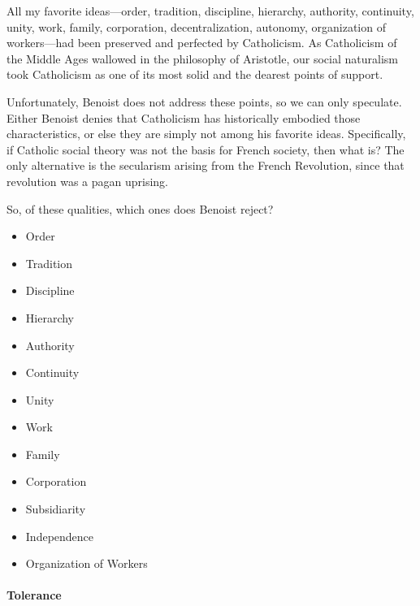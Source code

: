 \begin{quotex}
All my favorite ideas---order, tradition, discipline, hierarchy, authority, continuity, unity, work, family, corporation, decentralization, autonomy, organization of workers---had been preserved and perfected by Catholicism. As Catholicism of the Middle Ages wallowed in the philosophy of Aristotle, our social naturalism took Catholicism as one of its most solid and the dearest points of support.
\end{quotex}


Unfortunately, Benoist does not address these points, so we can only speculate. Either Benoist denies that Catholicism has historically embodied those characteristics, or else they are simply not among his favorite ideas. Specifically, if Catholic social theory was not the basis for French society, then what is? The only alternative is the secularism arising from the French Revolution, since that revolution was a pagan uprising.

So, of these qualities, which ones does Benoist reject?

\begin{itemize}


\item Order

\item Tradition

\item Discipline

\item Hierarchy

\item Authority

\item Continuity

\item Unity

\item Work

\item Family

\item Corporation

\item Subsidiarity

\item Independence

\item Organization of Workers
\end{itemize}


\paragraph{Tolerance}


